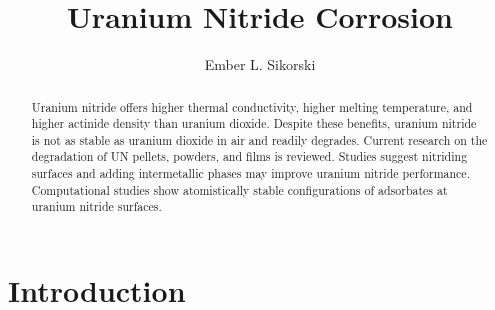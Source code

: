 \documentclass[3p,review,11pt]{elsarticle}
\begin{document}
\begin{frontmatter}
	\title{Uranium Nitride Corrosion}
	
	\author{Ember L. Sikorski}
	
	
	
	\begin{abstract}
Uranium nitride offers higher thermal conductivity, higher melting temperature, and higher actinide density than uranium dioxide. Despite these benefits, uranium nitride is not as stable as uranium dioxide in air and readily degrades. Current research on the degradation of UN pellets, powders, and films is reviewed. Studies suggest nitriding surfaces and adding intermetallic phases may improve uranium nitride performance. Computational studies show atomistically stable configurations of adsorbates at uranium nitride surfaces.
	\end{abstract}	
	
\end{frontmatter}


\section{Introduction}
\end{document}
